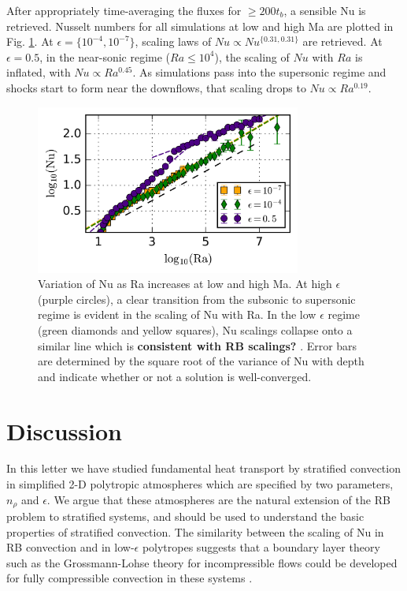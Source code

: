 \documentclass[aps, prl, twocolumn, nofootinbib, groupedaddress, amsfonts, amssymb, amsmath]{revtex4-1}
\newcommand{\nrho}{\ensuremath{n_{\rho}}}
\begin{document}
After appropriately time-averaging the fluxes for $\geq 200 t_b$, a sensible Nu is retrieved.  
Nusselt numbers for
all simulations at low and high Ma are plotted in Fig. \ref{fig:nu_v_ra}.  At $\epsilon = \{10^{-4}, 10^{-7}\}$,
scaling laws of $Nu \propto Nu^{\{0.31, 0.31\}}$ are retrieved.  At $\epsilon = 0.5$, in the near-sonic
regime ($Ra \leq 10^4$), the scaling of $Nu$ with $Ra$ is inflated, with $Nu \propto Ra^{0.45}$.  As simulations
pass into the supersonic regime and shocks start to form near the downflows,
that scaling drops to $Nu \propto Ra^{0.19}$.  

\begin{figure}[t]
\includegraphics[width=3.4375in]{./figs/nu_v_ra.png}
\caption{Variation of Nu as Ra increases at low and high Ma. 
At high $\epsilon$ (purple circles), 
a clear transition from the subsonic to supersonic regime is evident in the scaling
of Nu with Ra.  In the low $\epsilon$ regime (green diamonds and yellow squares), 
Nu scalings collapse onto a similar line which is
\textbf{consistent with RB scalings?} \cite{johnston&doering2009}.  Error bars are determined
 by the square root of the variance of Nu with depth and indicate whether or not a solution is well-converged.
\label{fig:nu_v_ra} }
\end{figure}

\section{Discussion}
\label{sec:discussion}
In this letter we have studied fundamental heat transport by stratified convection in simplified 2-D polytropic
atmospheres which are specified by two parameters, $\nrho$ 
and $\epsilon$.  We argue that these atmospheres are the natural extension
of the RB problem to stratified systems, and should be used to understand the basic properties of stratified
convection.  The similarity between the scaling of Nu in RB convection and in low-$\epsilon$ polytropes suggests 
that a boundary layer theory such as the Grossmann-Lohse theory for incompressible flows
could be developed for fully compressible convection in these systems \cite{ahlers&all2009}.  
\end{document}
